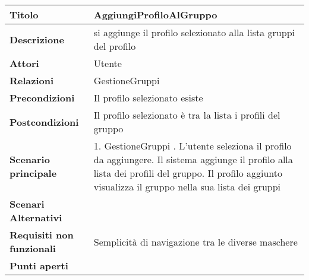 \begin{tabular} {|P{4.5cm}|P{12.5cm}|}
  \hline
  \textbf{Titolo}                   & AggiungiProfiloAlGruppo                                          \\
  \hline
  \textbf{Descrizione}              & si aggiunge il profilo selezionato alla lista gruppi del profilo \\
  \hline
  \textbf{Attori}                   & Utente                                                           \\
  \hline
  \textbf{Relazioni}                & GestioneGruppi                                                   \\
  \hline
  \textbf{Precondizioni}            & Il profilo selezionato esiste                                    \\
  \hline
  \textbf{Postcondizioni}           & Il profilo selezionato è tra la lista i profili del gruppo       \\
  \hline
  \textbf{Scenario principale}      & 1. GestioneGruppi . L'utente seleziona il profilo da aggiungere. Il sistema aggiunge il profilo alla lista dei profili del gruppo. Il profilo aggiunto visualizza il gruppo nella sua lista dei gruppi                               \\
  \hline
  \textbf{Scenari Alternativi}      &                                                                  \\
  \hline
  \textbf{Requisiti non funzionali} & Semplicità di navigazione tra le diverse maschere                \\
  \hline
  \textbf{Punti aperti}             &                                                                  \\
  \hline
\end{tabular}
\hfill
\break

